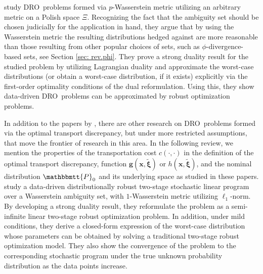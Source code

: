 \documentclass[final,onefignum,onetabnum]{class}
\newcommand{\bs}[1]{\boldsymbol{#1}} %
\newcommand{\Ts}[1]{\mathbbmtt{#1}} %
\newcommand{\txi}{\tilde{\bs{\xi}}}
\newcommand{\nomP}{\Ts{P}_{0}}
\newcommand{\dro}{DRO}
\begin{document}
\citet{gao2016} study \dro\ problems formed via  $p$-Wasserstein metric utilizing an arbitrary metric on a Polish space $\Xi$. Recognizing the fact that the ambiguity set should be chosen judicially for the application in hand, they argue that by using the Wasserstein metric the resulting distributions hedged against are more reasonable than those resulting from other popular choices
of sets, such as $\phi$-divergence-based sets, see Section \ref{sec: rev.phi}. %
They prove a strong duality result for the studied problem by utilizing Lagrangian duality and approximate the worst-case distributions (or obtain a worst-case distribution, if it exists) explicitly
via the first-order optimality conditions of the dual reformulation. Using this, they show data-driven \dro\ problems can be approximated by robust optimization problems.


In addition to the papers by \citet{blanchet2017DRO,mohajerin2018,gao2016}, there  are other research on \dro\ problems formed via the optimal transport discrepancy, but under more restricted assumptions,  %
that move the frontier of research in this area. 
In the following review, we mention the properties  of the transportation cost $c(\cdot, \cdot)$ in the definition of the optimal transport discrepancy, function $\bs{g}(\bs{x},\txi)$ or $h(\bs{x},\txi)$, and the nominal distribution $\nomP$ and its underlying space as studied in these papers. %
\citet{zhao2018wass} study a data-driven distributionally robust two-stage
stochastic linear program over a Wasserstein ambiguity set, with  $1$-Wasserstein metric utilizing $\ell_1$-norm. By developing a strong duality result, they reformulate the problem as a semi-infinite linear two-stage robust optimization problem. In addition, under mild conditions, they  derive a closed-form expression
of the worst-case distribution whose parameters can
be obtained by solving a traditional two-stage robust optimization
model.  They also show the convergence of the problem to the corresponding stochastic program under the true unknown probability distribution as the data points increase. %
\end{document}
